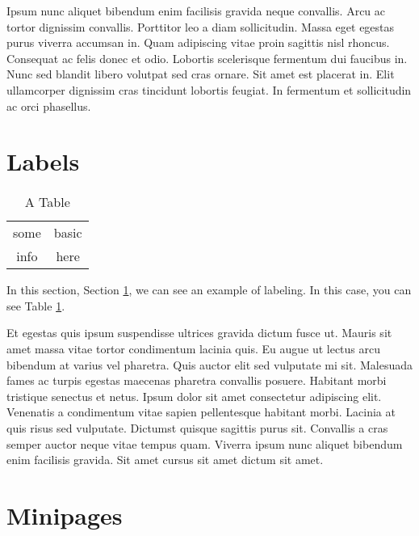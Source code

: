 \documentclass[11pt]{article}
\begin{document}
Ipsum nunc aliquet bibendum enim facilisis gravida neque convallis. Arcu ac tortor dignissim convallis. Porttitor leo a diam sollicitudin. Massa eget egestas purus viverra accumsan in. Quam adipiscing vitae proin sagittis nisl rhoncus. Consequat ac felis donec et odio. Lobortis scelerisque fermentum dui faucibus in. Nunc sed blandit libero volutpat sed cras ornare. Sit amet est placerat in. Elit ullamcorper dignissim cras tincidunt lobortis feugiat. In fermentum et sollicitudin ac orci phasellus.


\section{Labels}
\label{sec:labels}

\begin{table}[h]
  \begin{center}
\begin{tabular}{| c | c |}
  some & basic \\
  info & here \\
\end{tabular}
\end{center}
\caption{A Table} \label{tab:mytable}
\end{table}

\vspace{0.5cm}

In this section, Section \ref{sec:labels}, we can see an example of labeling. In this case, you can see Table \ref{tab:mytable}.

Et egestas quis ipsum suspendisse ultrices gravida dictum fusce ut. Mauris sit amet massa vitae tortor condimentum lacinia quis. Eu augue ut lectus arcu bibendum at varius vel pharetra. Quis auctor elit sed vulputate mi sit. Malesuada fames ac turpis egestas maecenas pharetra convallis posuere. Habitant morbi tristique senectus et netus. Ipsum dolor sit amet consectetur adipiscing elit. Venenatis a condimentum vitae sapien pellentesque habitant morbi. Lacinia at quis risus sed vulputate. Dictumst quisque sagittis purus sit. Convallis a cras semper auctor neque vitae tempus quam. Viverra ipsum nunc aliquet bibendum enim facilisis gravida. Sit amet cursus sit amet dictum sit amet.

\section{Minipages}
\end{document}
